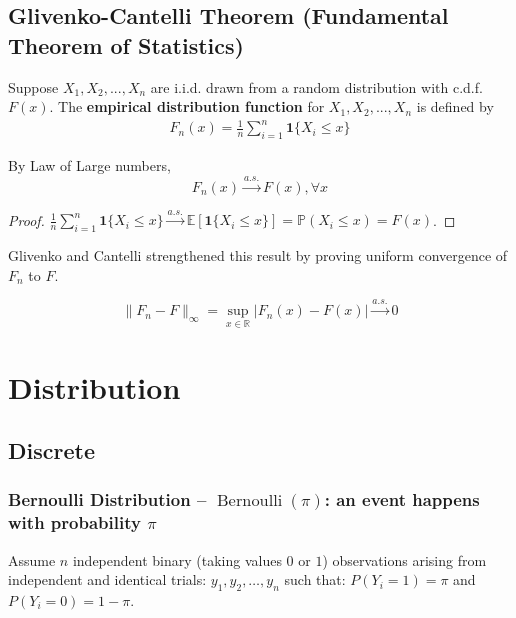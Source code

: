 \documentclass[11pt]{elegantbook}
\begin{document}
\section{Glivenko-Cantelli Theorem (Fundamental Theorem of Statistics)}
\begin{definition}
\normalfont
    Suppose $X_1,X_2,..., X_n$ are i.i.d. drawn from a random distribution with c.d.f. $F(x)$. The \textbf{empirical distribution function} for $X_1,X_2,..., X_n$ is defined by
    \begin{equation}
        \begin{aligned}
            F_n(x)=\frac{1}{n}\sum_{i=1}^{n}\mathbf{1}\{X_i\leq x\}
        \end{aligned}
        \nonumber
    \end{equation}
\end{definition}
\begin{proposition}
    By Law of Large numbers,
    $$F_n(x) \stackrel{a.s.}{\longrightarrow} F(x), \forall x$$
\end{proposition}
\begin{proof}
    $\frac{1}{n}\sum_{i=1}^{n}\mathbf{1}\{X_i\leq x\} \stackrel{a.s.}{\longrightarrow} \mathbb{E}[\mathbf{1}\{X_i\leq x\}]=\mathbb{P}(X_i\leq x)=F(x)$.
\end{proof}
Glivenko and Cantelli strengthened this result by proving uniform convergence of $F_n$ to $F$.
\begin{theorem}
    $$\|F_n-F\|_\infty=\sup_{x\in \mathbb{R}}|F_n(x)-F(x)| \stackrel{a.s.}{\longrightarrow} 0$$
\end{theorem}













\chapter{Distribution}

\section{Discrete}
\subsection{Bernoulli Distribution -- $\operatorname{Bernoulli}(\pi)$: an event happens with probability $\pi$}
Assume $n$ independent binary (taking values $0$ or $1$) observations arising from independent and identical trials: $y_{1}, y_{2}, \ldots, y_{n}$ such that: $P\left(Y_{i}=1\right)=\pi$ and $P\left(Y_{i}=0\right)=1-\pi$.
\end{document}
